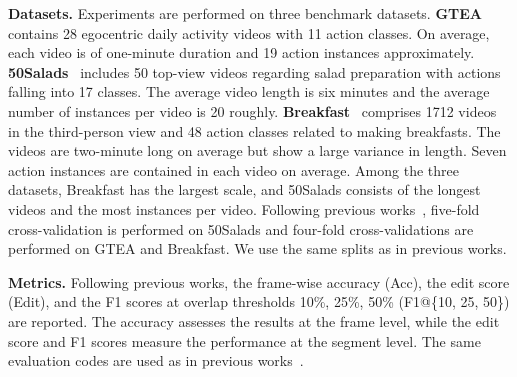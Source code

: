 \documentclass[10pt,twocolumn,letterpaper]{article}
\begin{document}
\textbf{Datasets.}
Experiments are performed on three benchmark datasets. 
\textbf{GTEA}~\cite{GTEA} contains 28 egocentric daily activity videos with 11 action classes. 
On average, each video is of one-minute duration and 19 action instances approximately.
\textbf{50Salads}~\cite{50Salads} includes 50 top-view videos regarding salad preparation with actions falling into 17 classes.
The average video length is six minutes and the average number of instances per video is 20 roughly.
\textbf{Breakfast}~\cite{Breakfast} comprises 1712 videos in the third-person view and 48 action classes related to making breakfasts.
The videos are two-minute long on average but show a large variance in length.
Seven action instances are contained in each video on average.
Among the three datasets, Breakfast has the largest scale, and 50Salads consists of the longest videos and the most instances per video.
Following previous works~\cite{2022_CVPR_Li,2022_ECCV_Behrmann,2022_NeurIPS_Xu,2021_BMVC_Yi,2020_PAMI_Li,2021_WACV_Ishikawa,2019_CVPR_Farha}, five-fold cross-validation is performed on 50Salads and four-fold cross-validations are performed on GTEA and Breakfast. 
We use the same splits as in previous works.


\textbf{Metrics.}
Following previous works, the frame-wise accuracy (Acc), the edit score (Edit), and the F1 scores at overlap thresholds {10\%, 25\%, 50\%} (F1@\{10, 25, 50\}) are reported.
The accuracy assesses the results at the frame level, while the edit score and F1 scores measure the performance at the segment level.
The same evaluation codes are used as in previous works~\cite{2021_BMVC_Yi,2019_CVPR_Farha}.
\end{document}
